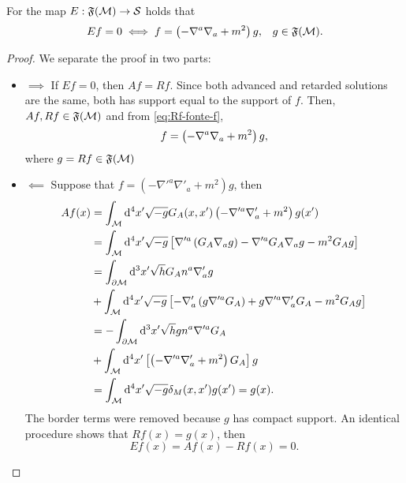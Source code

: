 \begin{proposition}\label{prop:E2}
    For the map \(E:{\mathfrak{F}}({\mathcal{M}})\to{\mathcal{S}}\) holds that
    \begin{equation}
        Ef=0\iff f=\left(-\nabla^a\nabla_a+m^2\right) g,\;\;\;g\in{\mathfrak{F}}({\mathcal{M}}).
    \end{equation}
\end{proposition}
\begin{proof}
    We separate the proof in two parts:
    \begin{itemize}
        \item \(\implies\)
        If \(Ef=0\), then \(Af=Rf\). Since both advanced and retarded solutions are the same, both has support equal to the support of \(f\). Then, \(Af,Rf\in{\mathfrak{F}}({\mathcal{M}})\) and from \cref{eq:Rf-fonte-f},
        \begin{equation}
            f=\left(-\nabla^a\nabla_a+m^2\right) g,
        \end{equation}
        where \(g=Rf\in{\mathfrak{F}}({\mathcal{M}})\)
        \item \(\impliedby\)
        Suppose that \(f=\left(-\nabla'^a\nabla'_a+m^2\right) g\), then
        \begin{subequations}
            \begin{align}
                Af(x)&=\int_\mathcal{M}\mathrm{d}^4x'\sqrt{-g}G_A(x,x')\left(-\nabla'^a\nabla'_a+m^2\right) g(x')\\
                &=\int_{\mathcal{M}}\mathrm{d}^4x'\sqrt{-g}\left[\nabla'^a\left(G_A\nabla_a g\right)-\nabla'^aG_A\nabla_a g-m^2G_A g\right]\\
                &=\int_{\partial\mathcal{M}}\mathrm{d}^3x'\sqrt{h}G_An^a\nabla'_ag\\
                &+\int_{\mathcal{M}}\mathrm{d}^4x'\sqrt{-g}\left[-\nabla'_a\left(g\nabla'^aG_A\right)+g\nabla'^a\nabla'_aG_A-m^2G_Ag\right]\\
                &=-\int_{\partial\mathcal{M}}\mathrm{d}^3x'\sqrt{h}gn^a\nabla'^aG_A\\
                &+\int_{\mathcal{M}}\mathrm{d}^4x'\left[\left(-\nabla'^a\nabla'_a+m^2\right)G_A\right]g\\
                &=\int_{\mathcal{M}}\mathrm{d}^4x'\sqrt{-g}\delta_M(x,x')g(x')=g(x).
            \end{align}
        \end{subequations}
        The border terms were removed because \(g\) has compact support. An identical procedure shows that \(Rf(x)=g(x)\), then
        \begin{equation}
            Ef(x)=Af(x)-Rf(x)=0.
        \end{equation}
    \end{itemize}
\end{proof}


